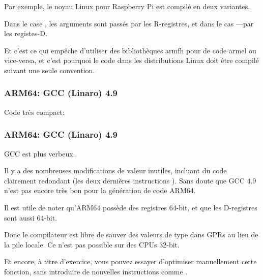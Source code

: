 Par exemple, le noyau Linux pour Raspberry Pi est compilé en deux variantes.

Dans le case , les arguments sont passés par les R-registres, et dans
le cas ---par les registes-D.

Et c'est ce qui empêche d'utiliser des bibliothèques armfh pour de code armel ou
vice-versa, et c'est pourquoi le code dans les distributions Linux doit être compilé
suivant une seule convention.
\fi

\subsubsection{ARM64: GCC \Optimizing (Linaro) 4.9}

Code très compact:



\subsubsection{ARM64: GCC \NonOptimizing (Linaro) 4.9}



GCC \NonOptimizing est plus verbeux.

Il y a des nombreuses modifications de valeur inutiles, incluant du code clairement
redondant (les deux dernières instructions ). Sans doute que GCC 4.9 n'est
pas encore très bon pour la génération de code ARM64.

Il est utile de noter qu'ARM64 possède des registres 64-bit, et que les D-registres
sont aussi 64-bit.

Donc le compilateur est libre de sauver des valeurs de type \Tdouble dans \ac{GPR}s
au lieu de la pile locale.
Ce n'est pas possible sur des CPUs 32-bit.

Et encore, à titre d'exercice, vous pouvez essayer d'optimiser manuellement cette
fonction, sans introduire de nouvelles instructions comme .
